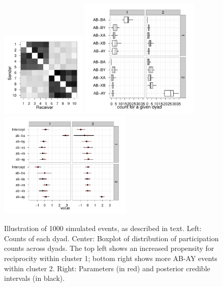 \documentclass[11pt]{article}
\begin{document}




\begin{figure}
\center
\includegraphics[width=1.6in]{../figs/synthetic/mat.pdf}
\includegraphics[width=2.25in]{../figs/synthetic/counts.pdf}
\includegraphics[width=2.5in]{../figs/synthetic/params-estimates.pdf}
\caption{Illustration of 1000 simulated events, as described in text. Left: Counts of each dyad. Center: Boxplot of distribution of participation counts across dyads.  The top left shows an increased propensity for reciprocity within cluster 1; bottom right shows more AB-AY events within cluster 2.  Right: Parameters (in red) and posterior credible intervals (in black).}
\label{fig:syncounts}
\end{figure}
\end{document}

